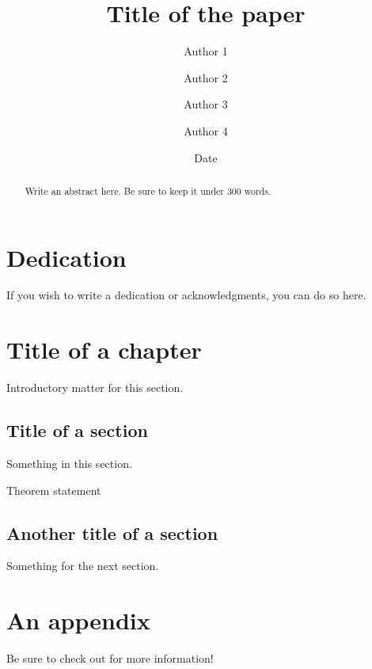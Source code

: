 \documentclass[twoside ]{memoir}
\title{Title of the paper}
\author{Author 1 \and Author 2 \and Author 3 \and Author 4}
\date{Date}
\begin{document}
\frontmatter

\maketitle

\chapter{Dedication}
If you wish to write a dedication or acknowledgments, you can do so here.

\begin{abstract}
  Write an abstract here.
  Be sure to keep it under 300 words.
\end{abstract}

\tableofcontents


\mainmatter

\chapter{Title of a chapter}
Introductory matter for this section.

\section{Title of a section}
Something in this section.

\begin{theorem}
  Theorem statement
\end{theorem}

\section{Another title of a section}
Something for the next section.

\appendix
\chapter{An appendix}
Be sure to check out \cite{notsoshort} for more information!

\backmatter
\printbibliography
\end{document}
